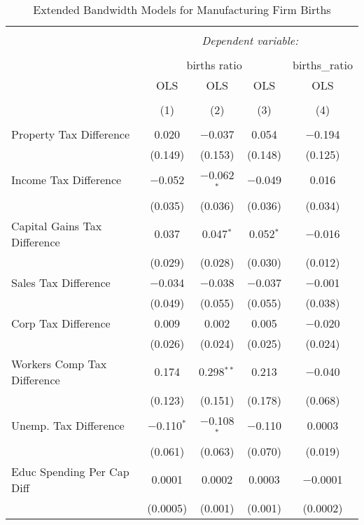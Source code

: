 
\begin{table}[!htbp] \centering 
  \caption{Extended Bandwidth Models for  Manufacturing Firm Births} 
  \label{31-33eb} 
\begin{tabular}{@{\extracolsep{5pt}}lcccc} 
\\[-1.8ex]\hline 
\hline \\[-1.8ex] 
 & \multicolumn{4}{c}{\textit{Dependent variable:}} \\ 
\cline{2-5} 
\\[-1.8ex] & \multicolumn{3}{c}{births ratio} & births\_ratio \\ 
 & OLS & OLS & OLS & OLS \\ 
\\[-1.8ex] & (1) & (2) & (3) & (4)\\ 
\hline \\[-1.8ex] 
 Property Tax Difference & 0.020 & $-$0.037 & 0.054 & $-$0.194 \\ 
  & (0.149) & (0.153) & (0.148) & (0.125) \\ 
  Income Tax Difference & $-$0.052 & $-$0.062$^{*}$ & $-$0.049 & 0.016 \\ 
  & (0.035) & (0.036) & (0.036) & (0.034) \\ 
  Capital Gains Tax Difference & 0.037 & 0.047$^{*}$ & 0.052$^{*}$ & $-$0.016 \\ 
  & (0.029) & (0.028) & (0.030) & (0.012) \\ 
  Sales Tax Difference & $-$0.034 & $-$0.038 & $-$0.037 & $-$0.001 \\ 
  & (0.049) & (0.055) & (0.055) & (0.038) \\ 
  Corp Tax Difference & 0.009 & 0.002 & 0.005 & $-$0.020 \\ 
  & (0.026) & (0.024) & (0.025) & (0.024) \\ 
  Workers Comp Tax Difference & 0.174 & 0.298$^{**}$ & 0.213 & $-$0.040 \\ 
  & (0.123) & (0.151) & (0.178) & (0.068) \\ 
  Unemp. Tax Difference & $-$0.110$^{*}$ & $-$0.108$^{*}$ & $-$0.110 & 0.0003 \\ 
  & (0.061) & (0.063) & (0.070) & (0.019) \\ 
  Educ Spending Per Cap Diff & 0.0001 & 0.0002 & 0.0003 & $-$0.0001 \\ 
  & (0.0005) & (0.001) & (0.001) & (0.0002) \\ 

\end{tabular}
\end{table}
